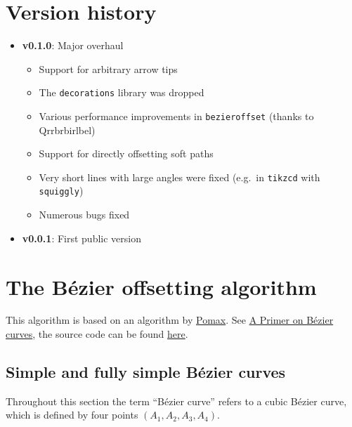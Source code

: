 \documentclass[12pt,a4paper]{article}
\theoremstyle{definition}
\begin{document}
\newpage
\section{Version history}

\begin{itemize}
  \item \textbf{v0.1.0}: Major overhaul
  \begin{itemize}
    \item Support for arbitrary arrow tips
    \item The \texttt{decorations} library was dropped
    \item Various performance improvements in \texttt{bezieroffset} (thanks to \hbox{Qrrbrbirlbel})
    \item Support for directly offsetting soft paths
    \item Very short lines with large angles were fixed (e.g.\ in \texttt{tikzcd} with \texttt{squiggly})
    \item Numerous bugs fixed
  \end{itemize}
  \item \textbf{v0.0.1}: First public version
\end{itemize}

\appendix
\newpage
\section{The Bézier offsetting algorithm}

This algorithm is based on an algorithm by \href{https://github.com/Pomax/}{Pomax}. See \href{https://pomax.github.io/bezierinfo/#offsetting}{A Primer on Bézier curves}, the source code can be found \href{https://github.com/Pomax/bezierinfo/blob/bcfce2149fa5e5540a2a2605986adab3b2a9a3bf/js/graphics-element/lib/bezierjs/bezier.js}{here}.

\subsection{Simple and fully simple Bézier curves}

Throughout this section the term ``Bézier curve'' refers to a cubic Bézier curve, which is defined by four points $(A_1, A_2, A_3, A_4)$.
\end{document}

